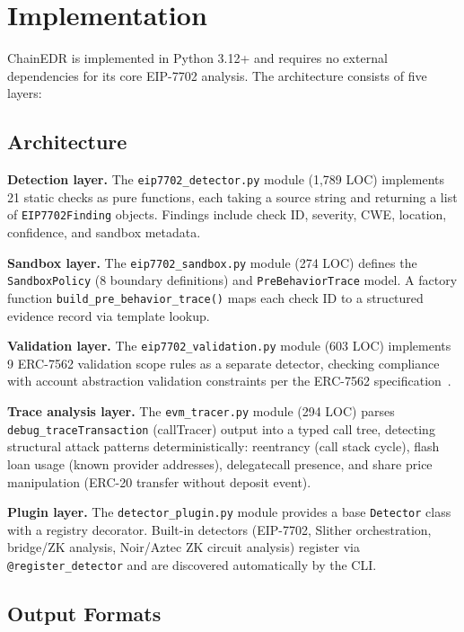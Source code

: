 \section{Implementation}
\label{sec:implementation}

ChainEDR is implemented in Python 3.12+ and requires no external dependencies for its core EIP-7702 analysis. The architecture consists of five layers:

\subsection{Architecture}

\textbf{Detection layer.} The \texttt{eip7702\_detector.py} module (1,789 LOC) implements 21 static checks as pure functions, each taking a source string and returning a list of \texttt{EIP7702Finding} objects. Findings include check ID, severity, CWE, location, confidence, and sandbox metadata.

\textbf{Sandbox layer.} The \texttt{eip7702\_sandbox.py} module (274 LOC) defines the \texttt{SandboxPolicy} (8 boundary definitions) and \texttt{PreBehaviorTrace} model. A factory function \texttt{build\_pre\_behavior\_trace()} maps each check ID to a structured evidence record via template lookup.

\textbf{Validation layer.} The \texttt{eip7702\_validation.py} module (603 LOC) implements 9 ERC-7562 validation scope rules as a separate detector, checking compliance with account abstraction validation constraints per the ERC-7562 specification~\cite{erc7562}.

\textbf{Trace analysis layer.} The \texttt{evm\_tracer.py} module (294 LOC) parses \texttt{debug\_traceTransaction} (callTracer) output into a typed call tree, detecting structural attack patterns deterministically: reentrancy (call stack cycle), flash loan usage (known provider addresses), delegatecall presence, and share price manipulation (ERC-20 transfer without deposit event).

\textbf{Plugin layer.} The \texttt{detector\_plugin.py} module provides a base \texttt{Detector} class with a registry decorator. Built-in detectors (EIP-7702, Slither orchestration, bridge/ZK analysis, Noir/Aztec ZK circuit analysis) register via \texttt{@register\_detector} and are discovered automatically by the CLI.

\subsection{Output Formats}

